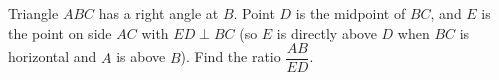 Triangle $ABC$ has a right angle at $B$. Point $D$ is the midpoint of $BC$, and $E$ is the point on side $AC$ with $ED\perp BC$ (so $E$ is directly above $D$ when $BC$ is horizontal and $A$ is above $B$). Find the ratio $\dfrac{AB}{ED}$.
